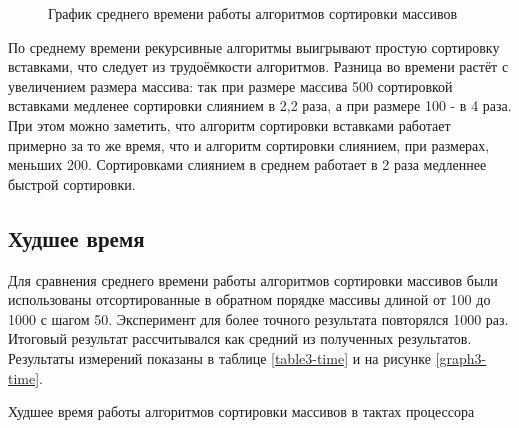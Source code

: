 \documentclass[12pt, a4paper]{report}
\begin{document}
	\begin{figure}[ht!]
		\caption{График среднего времени работы алгоритмов сортировки массивов}
		\label{graph2-time}
	\end{figure}

	По среднему времени рекурсивные алгоритмы выигрывают простую сортировку вставками, что следует из трудоёмкости алгоритмов. Разница во времени растёт с увеличением размера массива: так при размере массива 500 сортировкой вставками медленее сортировки слиянием в 2,2 раза, а при размере 100 - в 4 раза. При этом можно заметить, что алгоритм сортировки вставками работает примерно за то же время, что и алгоритм сортировки слиянием, при размерах, меньших 200. Сортировками слиянием в среднем работает в 2 раза медленнее быстрой сортировки.

	\newpage
	
	\subsection{Худшее время}
	Для сравнения среднего времени работы алгоритмов сортировки массивов были использованы отсортированные в обратном порядке массивы длиной от 100 до 1000 с шагом 50. Эксперимент для более точного результата повторялся 1000 раз. Итоговый результат рассчитывался как средний из полученных результатов. Результаты измерений показаны в таблице \ref{table3-time} и на рисунке \ref{graph3-time}.\\
	\begin{table}[ht!]
		\caption{Худшее время работы алгоритмов сортировки массивов в тактах процессора}
		\label{table3-time}
		\begin{center}
		\end{center}
	\end{table}
	
\end{document}
